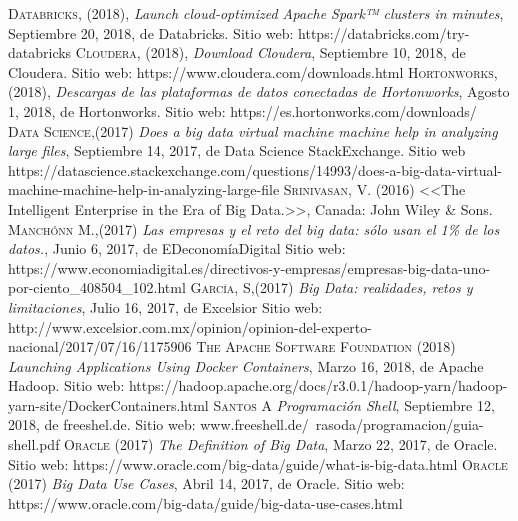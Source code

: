 \begin{thebibliography}{}
	 \textsc{Databricks}, (2018), \textit{Launch cloud-optimized Apache Spark™ clusters in minutes}, Septiembre 20, 2018, de Databricks. Sitio web: https://databricks.com/try-databricks
	 \textsc{Cloudera}, (2018), \textit{Download Cloudera}, Septiembre 10, 2018, de Cloudera. Sitio web: https://www.cloudera.com/downloads.html
	 \textsc{Hortonworks}, (2018), \textit{Descargas de las plataformas de datos conectadas de Hortonworks}, Agosto 1, 2018, de Hortonworks. Sitio web: https://es.hortonworks.com/downloads/
	 \textsc{Data Science},(2017)
	\textit{Does a big data virtual machine machine help in analyzing large files}, Septiembre 14, 2017, de Data Science StackExchange. Sitio web https://datascience.stackexchange.com/questions/14993/does-a-big-data-virtual-machine-machine-help-in-analyzing-large-file	
	 \textsc{Srinivasan, V.} (2016)
	<<The Intelligent Enterprise in the Era of Big Data.>>,
	Canada: John Wiley \& Sons.
	 \textsc{Manchónn M.},(2017)
	\textit{ Las empresas y el reto del big data: sólo usan el 1\% de los datos.},  Junio 6, 2017, de EDeconomíaDigital
	Sitio web: https://www.economiadigital.es/directivos-y-empresas/empresas-big-data-uno-por-ciento\_408504\_102.html
	 \textsc{García, S},(2017)
	\textit{Big Data: realidades, retos y limitaciones}, Julio 16, 2017, de Excelsior Sitio web:
	http://www.excelsior.com.mx/opinion/opinion-del-experto-nacional/2017/07/16/1175906	
	 \textsc{The Apache Software Foundation} (2018)
	\textit{Launching Applications Using Docker Containers}, Marzo 16, 2018, de Apache Hadoop. Sitio web: https://hadoop.apache.org/docs/r3.0.1/hadoop-yarn/hadoop-yarn-site/DockerContainers.html
	 \textsc{Santos A}
	\textit{Programación Shell}, Septiembre 12, 2018, de freeshel.de. Sitio web: www.freeshell.de/~rasoda/programacion/guia-shell.pdf
	 \textsc{Oracle} (2017) \textit{The Definition of Big Data}, Marzo 22, 2017, de Oracle. Sitio web: https://www.oracle.com/big-data/guide/what-is-big-data.html
	 \textsc{Oracle} (2017) \textit{Big Data Use Cases}, Abril 14, 2017, de Oracle. Sitio web: https://www.oracle.com/big-data/guide/big-data-use-cases.html

\end{thebibliography}
